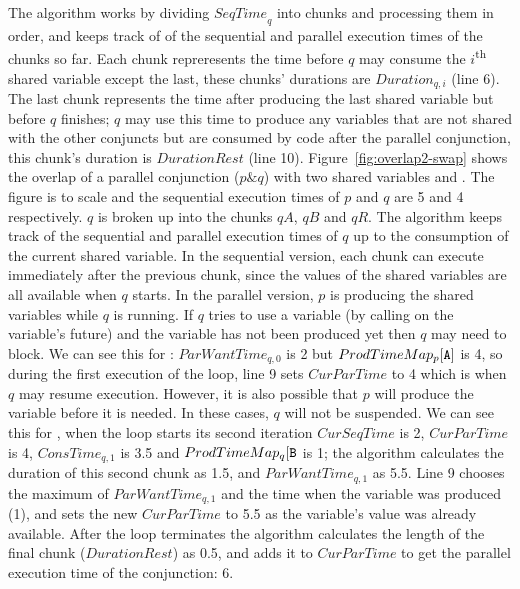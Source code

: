 
The algorithm works by dividing ${SeqTime}_q$ into chunks
and processing them in order,
and keeps track of of the sequential and parallel execution times of the
chunks so far.
Each chunk repreresents the time before $q$ may consume the
$i$\textsuperscript{th} shared variable except the last,
these chunks' durations are $Duration_{q, i}$ (line 6).
The last chunk represents the time after producing the last shared variable
but before $q$ finishes; 
$q$ may use this time to produce any variables that are not shared with the
other conjuncts but are consumed by code after the parallel conjunction,
this chunk's duration is $DurationRest$ (line 10).
Figure~\ref{fig:overlap2-swap} shows the overlap of a parallel conjunction 
($p \& q$) with two shared variables  and .
The figure is to scale and the sequential execution times of $p$ and $q$ are
5 and 4 respectively.
$q$ is broken up into the chunks $qA$, $qB$ and $qR$.
The algorithm keeps track of the sequential and parallel execution times of $q$
up to the consumption of the current shared variable.
In the sequential version,
each chunk can execute immediately after the previous chunk,
since the values of the shared variables are all available when $q$ starts.
In the parallel version,
$p$ is producing the shared variables while $q$ is running.
If $q$ tries to use a variable (by calling \wait on the variable's future)
and the variable has not been produced yet then $q$ may need to block.
We can see this for :
$ParWantTime_{q, 0}$ is 2 but $ProdTimeMap_p[\text{{\tt A}}]$ is 4,
so during the first execution of the loop,
line 9 sets $CurParTime$ to 4 which is when $q$ may resume execution.
However, it is also possible that $p$ will produce the variable before it is
needed.
In these cases, $q$ will not be suspended.
We can see this for ,
when the loop starts its second iteration $CurSeqTime$ is 2,
$CurParTime$ is 4, $ConsTime_{q, 1}$ is 3.5 and
$ProdTimeMap_q[\text{{\tt B}}$ is 1;
the algorithm calculates the duration of this second chunk as 1.5,
and $ParWantTime_{q, 1}$ as 5.5.
Line 9 chooses the maximum of $ParWantTime_{q, 1}$ and the time when the
variable was produced (1), and sets the new $CurParTime$ to 5.5 as the
variable's value was already available.
After the loop terminates the algorithm calculates the length of the final
chunk ($DurationRest$) as 0.5,
and adds it to $CurParTime$ to get the parallel execution time of the
conjunction: 6.


